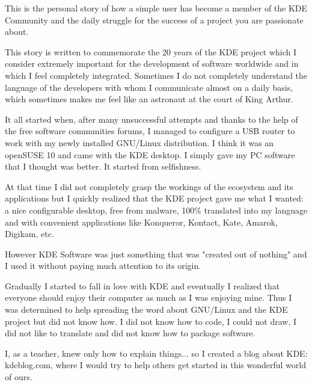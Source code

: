 

\noindent{}This is the personal story of how a simple user has become a member of the KDE Community and the daily struggle for the success of a project you are passionate about.

This story is written to commemorate the 20 years of the KDE project which I consider extremely important for the development of software worldwide and in which I feel completely integrated. Sometimes I do not completely understand the language of the developers with whom I communicate almost on a daily basis, which sometimes makes me feel like an astronaut at the court of King Arthur.

It all started when, after many unsuccessful attempts and thanks to the help of the free software communities forums, I managed to configure a USB router to work with my newly installed GNU/Linux distribution. I think it was an openSUSE 10 and came with the KDE desktop. I simply gave my PC software that I thought was better. It started from selfishness.

At that time I did not completely grasp the workings of the ecosystem and its applications but I quickly realized that the KDE project gave me what I wanted: a nice configurable desktop, free from malware, 100\% translated into my language and with convenient applications like Konqueror, Kontact, Kate, Amarok, Digikam, etc.

However KDE Software was just something that was "created out of nothing" and I used it without paying much attention to its origin.

Gradually I started to fall in love with KDE and eventually I realized that everyone should enjoy their computer as much as I was enjoying mine.
Thus I was determined to help spreading the word about GNU/Linux and the KDE project but did not know how. I did not know how to code, I could not draw, I did not like to translate and did not know how to package software.

I, as a teacher, knew only how to explain things... so I created a blog about KDE: kdeblog.com, where I would try to help others get started in this wonderful world of ours.

